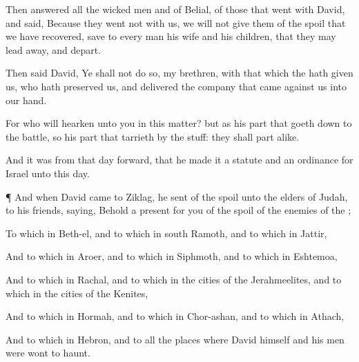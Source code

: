 {Then
answered all the
wicked
men and
{} of
Belial, of
those that
went with
David, and
said, Because they
went not with us, we will not
give them
{} of the
spoil that we have
recovered, save to every
man his
wife and his
children, that they may lead
{}
away, and
depart.

Then
said
David, Ye shall not do
so, my
brethren, with that which the
{} hath
given us, who hath
preserved us, and
delivered the
company that
came against us into our
hand.

For who will
hearken unto you in this
matter? but as his
part
{} that goeth
down to the
battle, so
{} his
part
{} that
tarrieth by the
stuff: they shall
part
alike.

And it was
{} from that
day
forward, that he
made it a
statute and an
ordinance for
Israel unto this
day.


\par }{\PP {}¶ And when
David
came to
Ziklag, he
sent of the
spoil unto the
elders of
Judah,
{} to his
friends,
saying, Behold a
present for you of the
spoil of the
enemies of the
{};

To
{} which
{} in
Beth-el, and to
{} which
{} in
south
Ramoth, and to
{} which
{} in
Jattir,

And to
{} which
{} in
Aroer, and to
{} which
{} in
Siphmoth, and to
{} which
{} in
Eshtemoa,

And to
{} which
{} in
Rachal, and to
{} which
{} in the
cities of the
Jerahmeelites, and to
{} which
{} in the
cities of the
Kenites,

And to
{} which
{} in
Hormah, and to
{} which
{} in
Chor-ashan, and to
{} which
{} in
Athach,

And to
{} which
{} in
Hebron, and to all the
places where
David himself and his
men were wont to
haunt.




\par }
